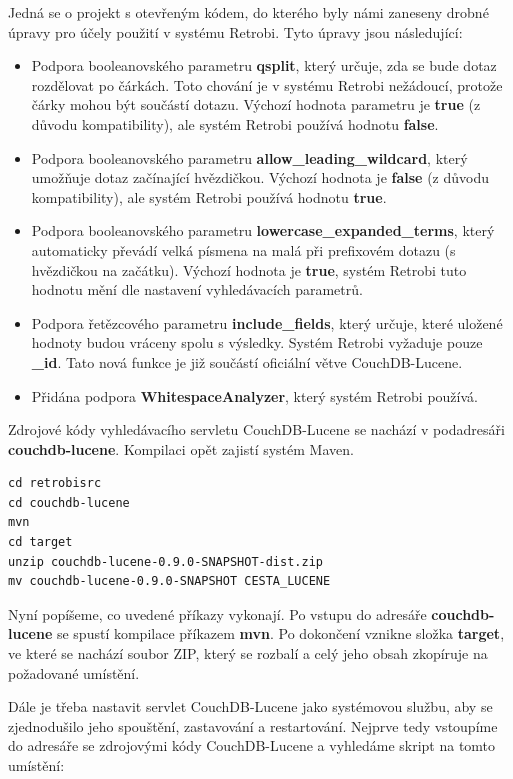 Jedná se o projekt s otevřeným kódem, do kterého byly námi zaneseny drobné úpravy pro účely použití v systému Retrobi. Tyto úpravy jsou následující:

\begin{itemize}
\item{Podpora booleanovského parametru {\bf qsplit}, který určuje, zda se bude dotaz rozdělovat po čárkách. Toto chování je v systému Retrobi nežádoucí, protože čárky mohou být součástí dotazu. Výchozí hodnota parametru je {\bf true} (z důvodu kompatibility), ale systém Retrobi používá hodnotu {\bf false}.}
\item{Podpora booleanovského parametru {\bf allow\_leading\_wildcard}, který umožňuje dotaz začínající hvězdičkou. Výchozí hodnota je {\bf false} (z důvodu kompatibility), ale systém Retrobi používá hodnotu {\bf true}.}
\item{Podpora booleanovského parametru {\bf lowercase\_expanded\_terms}, který automaticky převádí velká písmena na malá při prefixovém dotazu (s hvězdičkou na začátku). Výchozí hodnota je {\bf true}, systém Retrobi tuto hodnotu mění dle nastavení vyhledávacích parametrů.}
\item{Podpora řetězcového parametru {\bf include\_fields}, který určuje, které uložené hodnoty budou vráceny spolu s výsledky. Systém Retrobi vyžaduje pouze {\bf \_id}. Tato nová funkce je již součástí oficiální větve CouchDB-Lucene.}
\item{Přidána podpora {\bf WhitespaceAnalyzer}, který systém Retrobi používá.}
\end{itemize}

Zdrojové kódy vyhledávacího servletu CouchDB-Lucene se nachází v podadresáři {\bf couchdb-lucene}. Kompilaci opět zajistí systém Maven. 

\begin{verbatim}
cd retrobisrc
cd couchdb-lucene
mvn
cd target
unzip couchdb-lucene-0.9.0-SNAPSHOT-dist.zip
mv couchdb-lucene-0.9.0-SNAPSHOT CESTA_LUCENE
\end{verbatim}

Nyní popíšeme, co uvedené příkazy vykonají. Po vstupu do adresáře {\bf couchdb-lucene} se spustí kompilace příkazem {\bf mvn}. Po dokončení vznikne složka {\bf target}, ve které se nachází soubor ZIP, který se rozbalí a celý jeho obsah zkopíruje na požadované umístění.

Dále je třeba nastavit servlet CouchDB-Lucene jako systémovou službu, aby se zjednodušilo jeho spouštění, zastavování a restartování. Nejprve tedy vstoupíme do adresáře se zdrojovými kódy CouchDB-Lucene a vyhledáme skript na tomto umístění:


